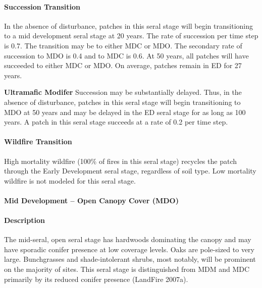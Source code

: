 \paragraph{Succession Transition} In the absence of disturbance, patches in this seral stage will begin transitioning to a mid development seral stage at 20 years. The rate of succession per time step is 0.7. The transition may be to either MDC or MDO. The secondary rate of succession to MDO is 0.4 and to MDC is 0.6. At 50 years, all patches will have succeeded to either MDC or MDO. On average, patches remain in ED for 27 years.
\begin{adjustwidth}{2cm}{}

\textbf{Ultramafic Modifer} Succession may be substantially delayed. Thus, in the absence of disturbance, patches in this seral stage will begin transitioning to MDO at 50 years and may be delayed in the ED seral stage for as long as 100 years. A patch in this seral stage succeeds at a rate of 0.2 per time step. 

\end{adjustwidth}
\paragraph{Wildfire Transition}
High mortality wildfire (100\% of fires in this seral stage) recycles the patch through the Early Development seral stage, regardless of soil type. Low mortality wildfire is not modeled for this seral stage.


\noindent\hrulefill


\paragraph{Mid Development – Open Canopy Cover (MDO)}

\paragraph{Description} The mid-seral, open seral stage has hardwoods dominating the canopy and may have sporadic conifer presence at low coverage levels. Oaks are pole-sized to very large. Bunchgrasses and shade-intolerant shrubs, most notably, will be prominent on the majority of sites. This seral stage is distinguished from MDM and MDC primarily by its reduced conifer presence (LandFire 2007a).

